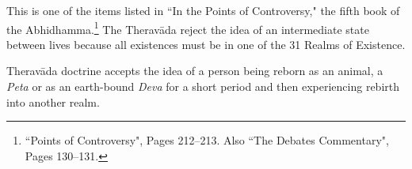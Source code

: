 This is one of the items listed in ``In the Points of Controversy," the fifth book of the Abhidhamma.\footnote{``Points of Controversy", Pages 212--213. Also ``The Debates Commentary", Pages 130--131.} The Theravāda reject the idea of an intermediate state between lives because all existences must be in one of the 31 Realms of Existence.

Theravāda doctrine accepts the idea of a person being reborn as an animal, a \textit{Peta} or as an earth-bound \textit{Deva} for a short period and then experiencing rebirth into another realm. 
